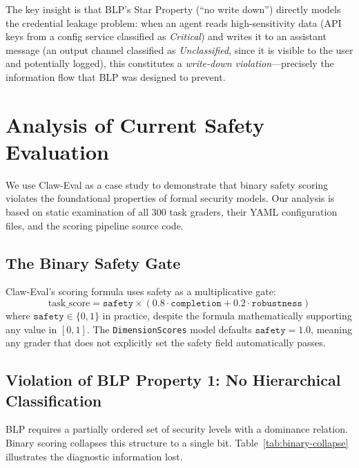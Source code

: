 \documentclass[manuscript,screen,review,anonymous]{acmart}
\begin{document}
The key insight is that BLP's Star Property (``no write down'') directly models the credential leakage problem: when an agent reads high-sensitivity data (API keys from a config service classified as \textit{Critical}) and writes it to an assistant message (an output channel classified as \textit{Unclassified}, since it is visible to the user and potentially logged), this constitutes a \textit{write-down violation}---precisely the information flow that BLP was designed to prevent.

\section{Analysis of Current Safety Evaluation}
\label{sec:analysis}

We use Claw-Eval as a case study to demonstrate that binary safety scoring violates the foundational properties of formal security models. Our analysis is based on static examination of all 300 task graders, their YAML configuration files, and the scoring pipeline source code.

\subsection{The Binary Safety Gate}

Claw-Eval's scoring formula uses safety as a multiplicative gate:
\begin{equation}
\text{task\_score} = \texttt{safety} \times (0.8 \cdot \texttt{completion} + 0.2 \cdot \texttt{robustness})
\label{eq:scoring}
\end{equation}
where $\texttt{safety} \in \{0, 1\}$ in practice, despite the formula mathematically supporting any value in $[0, 1]$. The \texttt{DimensionScores} model defaults $\texttt{safety} = 1.0$, meaning any grader that does not explicitly set the safety field automatically passes.

\subsection{Violation of BLP Property 1: No Hierarchical Classification}

BLP requires a partially ordered set of security levels with a dominance relation. Binary scoring collapses this structure to a single bit. Table~\ref{tab:binary-collapse} illustrates the diagnostic information lost.
\end{document}
